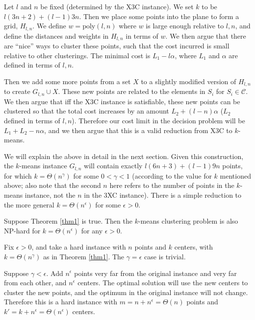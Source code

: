 Let $l$ and $n$ be fixed (determined by the X3C instance). We set $k$ to be $l(3n+2)+(l-1)3n$. Then we place some points into the plane to form a grid, $H_{l,n}$. We define $w =\text{poly}(l, n)$ where $w$ is large enough relative to $l,n$, and define the distances and weights in $H_{l,n}$ in terms of $w$. We then argue that there are ``nice'' ways to cluster these points, such that the cost incurred is small relative to other clusterings. The minimal cost is $L_1-l\alpha$, where $L_1$ and $\alpha$ are defined in terms of $l,n$.

Then we add some more points from a set $X$ to a slightly modified version of $H_{l,n}$ to create $G_{l,n}\cup X$. These new points are related to the elements in $S_i$ for $S_i\in\mathcal{C}$. We then argue that iff the X3C instance is satisfiable, these new points can be clustered so that the total cost increases by an amount $L_2+(l-n)\alpha$ ($L_2$ defined in terms of $l,n$). Therefore our cost limit in the decision problem will be $L_1+L_2-n\alpha$, and we then argue that this is a valid reduction from X3C to $k$-means.

We will explain the above in detail in the next section. Given this construction, the $k$-means instance $G_{l,n}$ will contain exactly $l(6n+3)+(l-1)9n$ points, for which $k=\Theta(n^\gamma)$ for some $0<\gamma<1$ (according to the value for $k$ mentioned above; also note that the second $n$ here refers to the number of points in the $k$-means instance, not the $n$ in the 3XC instance). There is a simple reduction to the more general $k=\Theta(n^\epsilon)$ for some $\epsilon>0$.

\begin{theorem}
    Suppose Theorem \ref{thm1} is true. Then the $k$-means clustering problem is also NP-hard for $k=\Theta(n^\epsilon)$ for any $\epsilon>0$.
\end{theorem}

Fix $\epsilon>0$, and take a hard instance with $n$ points and $k$ centers, with $k=\Theta(n^\gamma)$ as in Theorem \ref{thm1}. The $\gamma=\epsilon$ case is trivial.

Suppose $\gamma<\epsilon$. Add $n^\epsilon$ points very far from the original instance and very far from each other, and $n^\epsilon$ centers. The optimal solution will use the new centers to cluster the new points, and the optimum in the original instance will not change. Therefore this is a hard instance with $m = n+n^\epsilon=\Theta(n)$ points and $k'= k+n^\epsilon=\Theta(n^\epsilon)$ centers.

